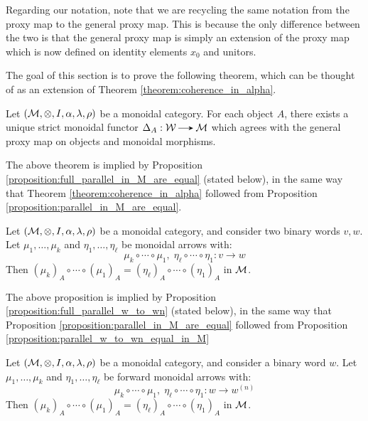 Regarding our notation, note that we are recycling the same notation from the proxy map 
to the general proxy map. This is because the only difference between the 
two is that the general proxy map is simply an extension of the proxy map which 
is now defined on identity elements $x_0$ and unitors. 

The goal of this section is to prove the following theorem, which can 
be thought of as an extension of Theorem \ref{theorem:coherence_in_alpha}.

\begin{theorem}\label{theorem:coherence_in_unitors}
    Let $(\mathcal{M}, \otimes, I, \alpha, \lambda, \rho)$ be a monoidal category. For  
    each object $A$, there exists a unique strict monoidal functor $\Delta_A: \ww \to \mm$ 
    which agrees with the general proxy map on objects and monoidal morphisms. 
\end{theorem}

The above theorem is implied by Proposition \ref{proposition:full_parallel_in_M_are_equal}
(stated below), in the same way that Theorem \ref{theorem:coherence_in_alpha} followed 
from Proposition \ref{proposition:parallel_in_M_are_equal}.

\begin{proposition}\label{proposition:full_parallel_in_M_are_equal}
    Let $(\mathcal{M}, \otimes, I, \alpha, \lambda, \rho)$ be a monoidal category, and consider 
    two binary words $v,w$.
    Let $\mu_1, \dots, \mu_k$ and $\eta_1, \dots,\eta_{\ell}$ be monoidal arrows with:
    \[
        \mu_k \circ \cdots \circ \mu_1, \; \eta_{\ell} \circ \cdots \circ \eta_1: v \to w
    \]
    Then $(\mu_k)_A \circ \cdots \circ (\mu_1)_A = (\eta_{\ell})_A\circ\cdots\circ (\eta_1)_A$ 
    in $\mathcal{M}$.
\end{proposition}

The above proposition is implied by Proposition \ref{proposition:full_parallel_w_to_wn} (stated below), 
in the same way that Proposition \ref{proposition:parallel_in_M_are_equal} 
followed from Proposition \ref{proposition:parallel_w_to_wn_equal_in_M}

\begin{proposition}\label{proposition:full_parallel_w_to_wn}
    Let $(\mathcal{M}, \otimes, I, \alpha, \lambda, \rho)$ be a monoidal category, and consider 
    a binary word $w$.
    Let $\mu_1, \dots, \mu_k$ and $\eta_1, \dots,\eta_{\ell}$ be forward monoidal arrows with:
    \[
        \mu_k \circ \cdots \circ \mu_1,\;  \eta_{\ell} \circ \cdots \circ \eta_1: w \to w^{(n)}
    \]
    Then $(\mu_k)_A \circ \cdots \circ (\mu_1)_A = (\eta_{\ell})_A\circ\cdots\circ (\eta_1)_A$ 
    in $\mathcal{M}$.
\end{proposition}

